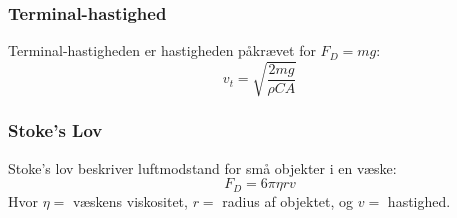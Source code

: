 \subsubsection{Terminal-hastighed}
Terminal-hastigheden er hastigheden påkrævet for $F_D = mg$:
\[
    v_t = \sqrt{\frac{2mg}{\rho C A}}
\]

\subsubsection{Stoke's Lov}
Stoke's lov beskriver luftmodstand for små objekter i en væske:
\[
    F_D = 6 \pi \eta r v
\]
Hvor $\eta =$ væskens viskositet, $r =$ radius af objektet, og $v =$ hastighed.